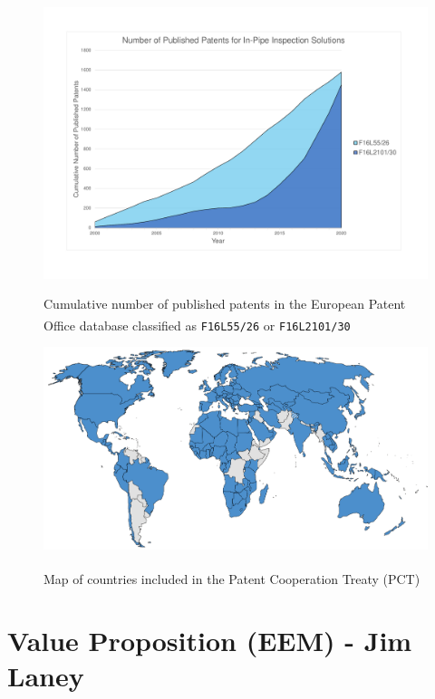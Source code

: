 \documentclass[11pt]{article}		%
\newlength{\imageheight}	 %
\newcommand{\supercite}[1]{\textsuperscript{\cite{#1}}}		%
\begin{document}
		\begin{figure}[h]
			\centering
			\begin{multicols}{2}
				\includegraphics[height=\imageheight]{patentGraph}
				\caption{Cumulative number of published patents in the European Patent Office database classified as \texttt{F16L55/26}\supercite{patent26} or \texttt{F16L2101/30}\supercite{patent30}}
				\label{patentGraph}
				\columnbreak
				\includegraphics[height=\imageheight]{pctMap}
				\caption{Map of countries included in the Patent Cooperation Treaty (PCT)\supercite{pct2020states}}
				\label{pctMap}
			\end{multicols}
		\end{figure}
	
	\section[Value Proposition - EEM]{Value Proposition (EEM) - Jim Laney} \label{solutionEvaluation}
	
\end{document}
